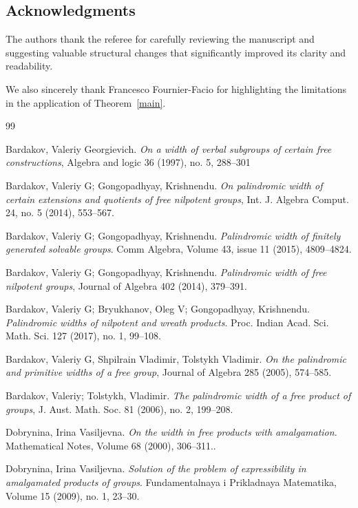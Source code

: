 \documentclass[12pt]{amsart}
\theoremstyle{definition}
\theoremstyle{remark}
\numberwithin{equation}{subsection}
\theoremstyle{plain}
\numberwithin{equation}{section}
\begin{document}
\subsection*{Acknowledgments}
The authors thank the referee for carefully reviewing the manuscript and suggesting valuable structural changes that significantly improved its clarity and readability. 

We also sincerely thank Francesco Fournier-Facio for highlighting the limitations in the application of Theorem~\ref{main}.

\begin{thebibliography}{99}

 Bardakov, Valeriy Georgievich. {\it On a width of verbal subgroups of certain free constructions}, Algebra and logic {36} (1997), no. 5, 288--301


 Bardakov, Valeriy G;  Gongopadhyay, Krishnendu.   {\it On palindromic width of certain extensions and quotients of free nilpotent groups}, Int. J. Algebra Comput. {24}, no. 5 (2014), 553--567.

  Bardakov, Valeriy G;  Gongopadhyay, Krishnendu.  {\it Palindromic width of finitely generated solvable groups}.  Comm Algebra,  Volume 43, issue 11 (2015), 4809--4824.

 Bardakov, Valeriy G;  Gongopadhyay, Krishnendu. {\it Palindromic width of free nilpotent groups}, Journal of Algebra {402} (2014), 379--391.

  Bardakov, Valeriy G;  Bryukhanov, Oleg V;  Gongopadhyay, Krishnendu.  {\it Palindromic widths of nilpotent and wreath products}.
 Proc. Indian Acad. Sci. Math. Sci.  127  (2017),  no. 1, 99--108.

 Bardakov, Valeriy G, Shpilrain Vladimir, Tolstykh Vladimir. {\it On the palindromic and primitive widths
of a free group},  Journal of Algebra {285} (2005),
574--585.

Bardakov, Valeriy;  Tolstykh, Vladimir. {\it The palindromic width of a free product of groups},  J. Aust. Math. Soc. {81} (2006), no. 2, 199--208.		
		

 Dobrynina, Irina Vasiljevna. {\it On the width in free products with amalgamation}. Mathematical Notes, Volume 68 (2000), 306--311..

 Dobrynina, Irina Vasiljevna. {\it Solution of the problem of expressibility in amalgamated products of groups}. Fundamentalnaya i Prikladnaya Matematika, Volume 15 (2009), no. 1, 23--30.


\end{thebibliography}
\end{document}
